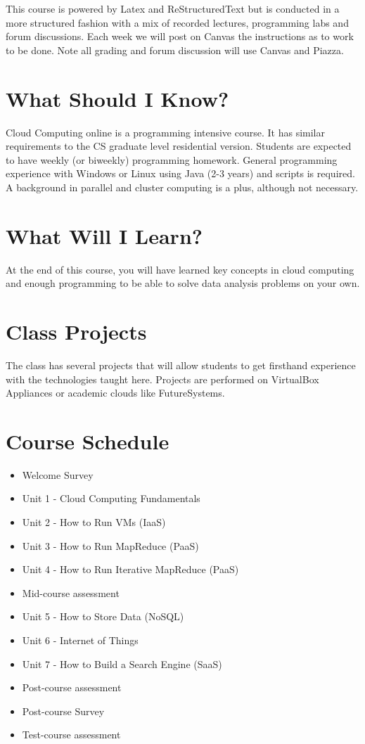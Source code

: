 This course is powered by Latex and ReStructuredText but is conducted
in a more structured fashion with a mix of recorded lectures,
programming labs and forum discussions. Each week we will post on
Canvas the instructions as to work to be done. Note all grading and
forum discussion will use Canvas and Piazza.

\section{What Should I Know?}

Cloud Computing online is a programming intensive course. It has
similar requirements to the CS graduate level residential
version. Students are expected to have weekly (or biweekly)
programming homework. General programming experience with Windows or
Linux using Java (2-3 years) and scripts is required. A background in
parallel and cluster computing is a plus, although not necessary.

\section{What Will I Learn?}

At the end of this course, you will have learned key concepts in cloud
computing and enough programming to be able to solve data analysis
problems on your own.

\section{Class Projects}

The class has several projects that will allow students to get
firsthand experience with the technologies taught here. Projects are
performed on VirtualBox Appliances or academic clouds like FutureSystems.

\section{Course Schedule}



\begin{itemize}
  \item Welcome Survey
  \item Unit 1 - Cloud Computing Fundamentals
  \item Unit 2 - How to Run VMs (IaaS)
  \item Unit 3 - How to Run MapReduce (PaaS)
  \item Unit 4 - How to Run Iterative MapReduce (PaaS)
  \item Mid-course assessment
  \item Unit 5 - How to Store Data (NoSQL)
  \item Unit 6 - Internet of Things
  \item Unit 7 - How to Build a Search Engine (SaaS)
  \item Post-course assessment
  \item Post-course Survey
  \item Test-course assessment
\end{itemize}

